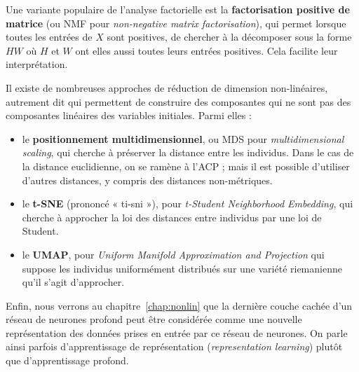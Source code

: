 \begin{plusloin}
\item Une variante populaire de l'analyse factorielle est la
  \textbf{factorisation positive de matrice} (ou NMF pour \textit{non-negative
    matrix factorisation}), qui permet lorsque toutes les entrées de $X$ sont
  positives, de chercher à la décomposer sous la forme $H W$ où $H$ et $W$ ont
  elles aussi toutes leurs entrées positives. Cela facilite leur
  interprétation.
\item Il existe de nombreuses approches de réduction de dimension
  non-linéaires, autrement dit qui permettent de construire des composantes qui
  ne sont pas des composantes linéaires des variables initiales. Parmi elles :
  \begin{itemize}
  \item le \textbf{positionnement multidimensionnel}, ou MDS pour {\it
      multidimensional scaling}, qui cherche à préserver la distance entre les
    individus. Dans le cas de la distance euclidienne, on se ramène à l'ACP ;
    mais il est possible d'utiliser d'autres distances, y compris des distances
    non-métriques.
  \item le \textbf{t-SNE} (prononcé « ti-sni »), pour {\it t-Student
      Neighborhood Embedding}, qui cherche à approcher la loi des distances
    entre individus par une loi de Student.
  \item le \textbf{UMAP}, pour {\it Uniform Manifold Approximation and
      Projection} qui suppose les individus uniformément distribués sur une
    variété riemanienne qu'il s'agit d'approcher.
  \end{itemize}
\item Enfin, nous verrons au chapitre~\ref{chap:nonlin} que la dernière couche
  cachée d'un réseau de neurones profond peut être considérée comme une
  nouvelle représentation des données prises en entrée par ce réseau de
  neurones. On parle ainsi parfois d'apprentissage de représentation
  (\textit{representation learning}) plutôt que d'apprentissage profond.
\vspace{-13pt}
\end{plusloin}







